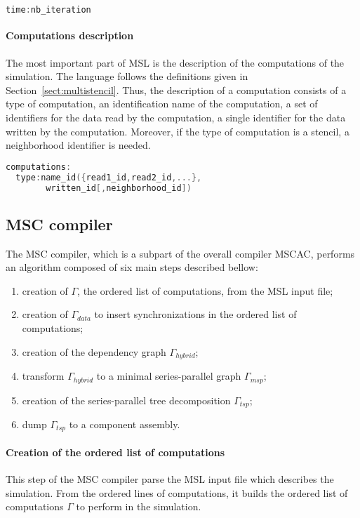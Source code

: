 \begin{lstlisting}[basicstyle=\footnotesize,mathescape,frame=single,language=C++]
time:nb_iteration
\end{lstlisting}

\paragraph{Computations description} The most important part of MSL is the description of the computations of the simulation. The language follows the definitions given in Section~\ref{sect:multistencil}. Thus, the description of a computation consists of a type of computation, an identification name of the computation, a set of identifiers for the data read by the computation, a single identifier for the data written by the computation. Moreover, if the type of computation is a stencil, a neighborhood identifier is needed.

\begin{lstlisting}[basicstyle=\footnotesize,mathescape,frame=single,language=C++]
computations:
  type:name_id({read1_id,read2_id,...},
 	    written_id[,neighborhood_id])
\end{lstlisting}

\subsection{MSC compiler}
The MSC compiler, which is a subpart of the overall compiler MSCAC, performs an algorithm composed of six main steps described bellow:

\begin{enumerate}
\item creation of $\Gamma$, the ordered list of computations, from the MSL input file;
\item creation of $\Gamma_{data}$ to insert synchronizations in the ordered list of computations;
\item creation of the dependency graph $\Gamma_{hybrid}$;
\item transform $\Gamma_{hybrid}$ to a minimal series-parallel graph $\Gamma_{msp}$;
\item creation of the series-parallel tree decomposition $\Gamma_{tsp}$;
\item dump $\Gamma_{tsp}$ to a component assembly.
\end{enumerate}

\paragraph{Creation of the ordered list of computations} This step of the MSC compiler parse the MSL input file which describes the simulation. From the ordered lines of computations, it builds the ordered list of computations $\Gamma$ to perform in the simulation.

